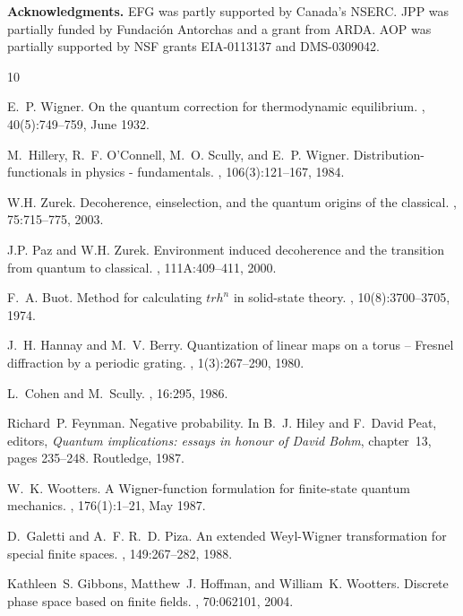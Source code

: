 \documentclass[aps,twocolumn,showpacs,nofootinbib,superscriptaddress]{revtex4}
\begin{document}
\textbf{Acknowledgments.} EFG was partly supported by Canada's
NSERC. JPP was partially funded by Fundaci\'on Antorchas and a
grant from ARDA. AOP was partially supported by NSF grants
EIA-0113137 and DMS-0309042.


\begin{thebibliography}{10}

E.~P. Wigner.
\newblock On the quantum correction for thermodynamic equilibrium.
, 40(5):749--759, June 1932.

M.~Hillery, R.~F. O'Connell, M.~O. Scully, and E.~P. Wigner.
\newblock Distribution-functionals in physics - fundamentals.
, 106(3):121--167, 1984.

W.H. Zurek.
\newblock Decoherence, einselection, and the quantum origins of the classical.
, 75:715--775, 2003.

J.P. Paz and W.H. Zurek.
\newblock Environment induced decoherence and the transition from quantum to
  classical.
, 111A:409--411, 2000.

F.~A. Buot.
\newblock Method for calculating $tr h^n$ in solid-state theory.
, 10(8):3700--3705, 1974.

J.~H. Hannay and M.~V. Berry.
\newblock Quantization of linear maps on a torus -- {F}resnel diffraction by a
  periodic grating.
, 1(3):267--290, 1980.

L.~Cohen and M.~Scully.
, 16:295, 1986.

Richard~P. Feynman.
\newblock Negative probability.
\newblock In B.~J. Hiley and F.~David Peat, editors, {\em Quantum implications:
  essays in honour of {D}avid {B}ohm}, chapter~13, pages 235--248. Routledge,
  1987.

W.~K. Wootters.
\newblock A {W}igner-function formulation for finite-state quantum mechanics.
, 176(1):1--21, May 1987.

D.~Galetti and A.~F. R.~D. Piza.
\newblock An extended {W}eyl-{W}igner transformation for special finite spaces.
, 149:267--282, 1988.

Kathleen~S. Gibbons, Matthew~J. Hoffman, and William~K. Wootters.
\newblock Discrete phase space based on finite fields.
, 70:062101, 2004.


\end{thebibliography}
\end{document}
